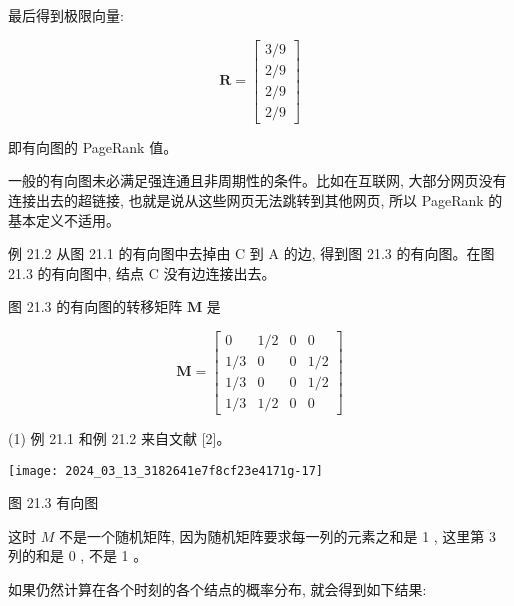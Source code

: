 \documentclass[10pt]{article}
\begin{document}
\begin{CJK*}{UTF8}{bsmi}
最后得到极限向量:

$$
\boldsymbol{R}=\left[\begin{array}{c}
3 / 9 \\
2 / 9 \\
2 / 9 \\
2 / 9
\end{array}\right]
$$

即有向图的 PageRank 值。

一般的有向图未必满足强连通且非周期性的条件。比如在互联网, 大部分网页没有连接出去的超链接, 也就是说从这些网页无法跳转到其他网页, 所以 PageRank 的基本定义不适用。

例 21.2 从图 21.1 的有向图中去掉由 $\mathrm{C}$ 到 $\mathrm{A}$ 的边, 得到图 21.3 的有向图。在图 21.3 的有向图中, 结点 $\mathrm{C}$ 没有边连接出去。

图 21.3 的有向图的转移矩阵 $\boldsymbol{M}$ 是

$$
\boldsymbol{M}=\left[\begin{array}{cccc}
0 & 1 / 2 & 0 & 0 \\
1 / 3 & 0 & 0 & 1 / 2 \\
1 / 3 & 0 & 0 & 1 / 2 \\
1 / 3 & 1 / 2 & 0 & 0
\end{array}\right]
$$

(1) 例 21.1 和例 21.2 来自文献 [2]。

\begin{center}
\texttt{[image: 2024\_03\_13\_3182641e7f8cf23e4171g-17]}
\end{center}

图 21.3 有向图

这时 $M$ 不是一个随机矩阵, 因为随机矩阵要求每一列的元素之和是 1 , 这里第 3 列的和是 0 , 不是 1 。

如果仍然计算在各个时刻的各个结点的概率分布, 就会得到如下结果:


\end{CJK*}
\end{document}
